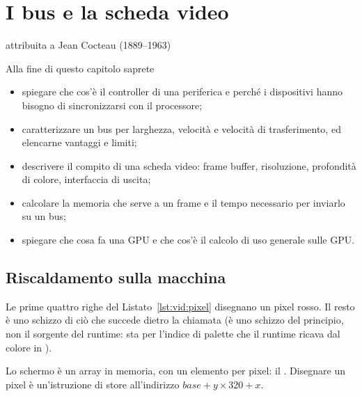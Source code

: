 \chapter{I bus e la scheda video}
\label{ch:video}

  {attribuita a Jean Cocteau (1889--1963)}

\begin{chapgoals}
Alla fine di questo capitolo saprete
\begin{itemize}
\item spiegare che cos'è il controller di una periferica e perché i dispositivi hanno bisogno di sincronizzarsi con il processore;
\item caratterizzare un bus per larghezza, velocità e velocità di trasferimento, ed elencarne vantaggi e limiti;
\item descrivere il compito di una scheda video: frame buffer, risoluzione, profondità di colore, interfaccia di uscita;
\item calcolare la memoria che serve a un frame e il tempo necessario per inviarlo su un bus;
\item spiegare che cosa fa una GPU e che cos'è il calcolo di uso generale sulle GPU.
\end{itemize}
\end{chapgoals}


\section{Riscaldamento sulla macchina}


Le prime quattro righe del Listato~\ref{lst:vid:pixel} disegnano un pixel
rosso. Il resto è uno schizzo di ciò che succede dietro la chiamata (è uno
schizzo del principio, non il sorgente del runtime:  sta per l'indice
di palette che il runtime ricava dal colore in ).

\begin{prgconcept}
Lo schermo è un array in memoria, con un elemento per pixel: il . Disegnare un pixel è un'istruzione di store all'indirizzo
$\mathit{base}+y\times 320+x$.
\end{prgconcept}

